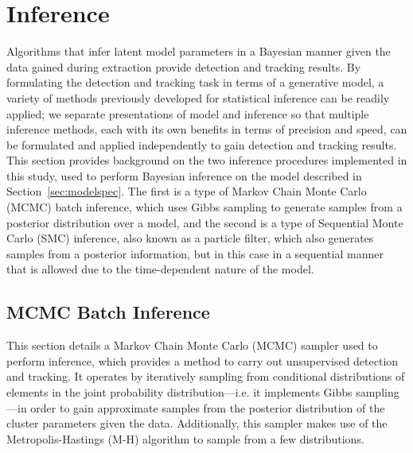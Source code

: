 \documentclass[smallcondensed, final]{svjour3}
\begin{document}

\section{Inference}
\label{sec:inference}
Algorithms that infer latent model parameters in a Bayesian manner given the data gained during extraction provide detection and tracking results. By formulating the detection and tracking task in terms of a generative model, a variety of methods previously developed for statistical inference can be readily applied; we separate presentations of model and inference so that multiple inference methods, each with its own benefits in terms of precision and speed, can be formulated and applied independently to gain detection and tracking results. This section provides background on the two inference procedures implemented in this study, used to perform Bayesian inference on the model described in Section~\ref{sec:modelspec}. The first is a type of Markov Chain Monte Carlo (MCMC) batch inference, which uses Gibbs sampling to generate samples from a posterior distribution over a model, and the second is a type of Sequential Monte Carlo (SMC) inference, also known as a particle filter, which also generates samples from a posterior information, but in this case in a sequential manner that is allowed due to the time-dependent nature of the model.






\subsection{MCMC Batch Inference}
\label{sec:MCMC}

This section details a Markov Chain Monte Carlo (MCMC) sampler used to perform inference, which provides a method to carry out unsupervised detection and tracking. It operates by iteratively sampling from conditional distributions of elements in the joint probability distribution---i.e. it implements Gibbs sampling---in order to gain approximate samples from the posterior distribution of the cluster parameters given the data. Additionally, this sampler makes use of the Metropolis-Hastings (M-H) algorithm to sample from a few distributions.
\end{document}
